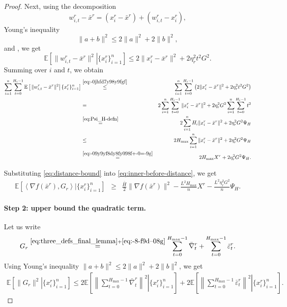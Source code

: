 \documentclass{article}
\newcommand{\anglebr}[1]{\left\langle#1\right\rangle} %
\newcommand{\inner}[2]{\anglebr{#1, #2}}
\newcommand{\ExpCond}[2]{{\mathbb{E}}\left[\left.#1\right\vert#2\right]}
\theoremstyle{plain}
\theoremstyle{definition}
\begin{document}
\begin{proof}
Next, using the decomposition
\begin{equation*}
w_{i,t}^r-\bar x^r
=
(x_i^r-\bar x^r)+(w_{i,t}^r-x_i^r),
\end{equation*}
Young's inequality
\[
\|a+b\|^2 \le 2\|a\|^2+2\|b\|^2,
\]
and , we get
\begin{equation}\label{eq:-0jhfd7y98y9fgf}
\ExpCond{ \|w_{i,t}^r-\bar x^r\|^2 }{ \{x_i^r\}_{i=1}^n }
\le
2\|x_i^r-\bar x^r\|^2 + 2\eta_r^2 t^2 G^2.
\end{equation}
Summing over \(i\) and \(t\), we obtain
\begin{eqnarray}
\sum_{i=1}^n\sum_{t=0}^{H_i-1}
\ExpCond{ \|w_{i,t}^r-\bar x^r\|^2 }{ \{x_i^r\}_{i=1}^n }
&\overset{\eqref{eq:-0jhfd7y98y9fgf}}{\leq}&
\sum_{i=1}^n\sum_{t=0}^{H_i-1}
\left(
2\|x_i^r-\bar x^r\|^2 + 2\eta_r^2 t^2 G^2
\right)
\notag\\
&=&
2\sum_{i=1}^n\sum_{t=0}^{H_i-1}\|x_i^r-\bar x^r\|^2
+
2\eta_r^2 G^2\sum_{i=1}^n\sum_{t=0}^{H_i-1} t^2
\notag\\
&\overset{\eqref{eq:Psi_H-defn}}{=}&
2\sum_{i=1}^n H_i \|x_i^r-\bar x^r\|^2
+
2\eta_r^2 G^2 \Psi_H
\notag\\
&\leq&
2H_{\max}\sum_{i=1}^n \|x_i^r-\bar x^r\|^2
+
2\eta_r^2 G^2 \Psi_H
\notag\\
&\overset{\eqref{eq:-09y9yf8dy8fy098f+-0=-9g}}{=}&
2H_{\max}X^r + 2\eta_r^2 G^2\Psi_H.
\label{eq:distance-bound}
\end{eqnarray}

Substituting \eqref{eq:distance-bound} into \eqref{eq:inner-before-distance}, we get
\begin{eqnarray}
\ExpCond{ \inner{\nabla f(\bar x^r)}{G_r} }{ \{x_i^r\}_{i=1}^n }
&\ge&
\frac{\bar H}{2}\|\nabla f(\bar x^r)\|^2
-
\frac{L^2H_{\max}}{n}X^r
-
\frac{L^2\eta_r^2G^2}{n}\Psi_H.
\label{eq:inner-term-final}
\end{eqnarray}


\paragraph{Step 2: upper bound the quadratic term.}
Let us write
\[
G_r
\overset{\eqref{eq:three_defs_final_lemma}+\eqref{eq:-8-f9d--08g} }{=}
\sum_{t=0}^{H_{\max}-1}\bar\nabla_t^r
+
\sum_{t=0}^{H_{\max}-1}\bar\varepsilon_t^r.
\]
Using Young's inequality \(\|a+b\|^2\le 2\|a\|^2+2\|b\|^2\), we get
\begin{eqnarray}
\ExpCond{ \|G_r\|^2 }{ \{x_i^r\}_{i=1}^n }
\le
2\ExpCond{ \left\|\sum_{t=0}^{H_{\max}-1}\bar\nabla_t^r\right\|^2 }{ \{x_i^r\}_{i=1}^n }
+
2\ExpCond{ \left\|\sum_{t=0}^{H_{\max}-1}\bar\varepsilon_t^r\right\|^2 }{ \{x_i^r\}_{i=1}^n }.
\label{eq:G-split}
\end{eqnarray}


\end{proof}
\end{document}
